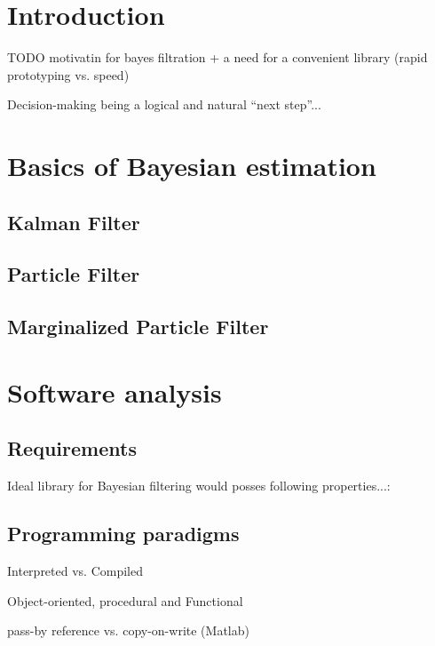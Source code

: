 \documentclass[a4paper,12pt,oneside]{report}
\newif\ifrelease %
\begin{document}
\ifrelease
\fi


\newpage
\tableofcontents


\chapter*{Introduction} 

TODO motivatin for bayes filtration + a need for a convenient library (rapid prototyping vs. speed)

Decision-making being a logical and natural ``next step''...


\chapter{Basics of Bayesian estimation}

\section{Kalman Filter}

\section{Particle Filter}

\section{Marginalized Particle Filter}


\chapter{Software analysis}

\section{Requirements}

Ideal library for Bayesian filtering would posses following properties...:

\section{Programming paradigms}

Interpreted vs. Compiled

Object-oriented, procedural and Functional

pass-by reference vs. copy-on-write (Matlab)
\end{document}

